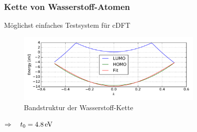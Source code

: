 \begin{frame}
\frametitle{Kette von Wasserstoff-Atomen}
\begin{minipage}{0.6\textwidth}
Möglichst einfaches Testsystem für cDFT
\end{minipage}
\begin{minipage}{0.39\textwidth}
\centering
{}
\end{minipage}
\begin{figure}[]
	\centering
	\includegraphics[width = 9cm]{Images/Hydrogen/bands/hydrogen_band_structure}
	\caption{Bandstruktur der Wasserstoff-Kette}
	\label{image_hydrogen_band_structure}
\end{figure}
\centering
$\Rightarrow\quad t_0 = \unit[4.8]{eV}$ 
\end{frame}

